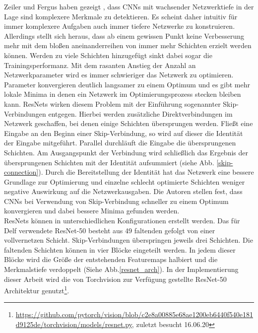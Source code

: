 Zeiler und Fergus haben gezeigt \cite{extraction_point_meaning}, dass CNNs mit wachsender Netzwerktiefe in der Lage sind komplexere Merkmale zu detektieren. Es scheint daher intuitiv für immer komplexere Aufgaben auch immer tiefere Netzwerke zu konstruieren. Allerdings stellt sich heraus, dass ab einem gewissen Punkt keine Verbesserung mehr mit dem bloßen aneinanderreihen von immer mehr Schichten erzielt werden können. Werden zu viele Schichten hinzugefügt sinkt dabei sogar die Trainingsperformanz. Mit dem rasanten Anstieg der Anzahl an Netzwerkparameter wird es immer schwieriger das Netzwerk zu optimieren. Parameter konvergieren deutlich langsamer zu einem Optimum und es gibt mehr lokale Minima in denen ein Netzwerk im Optimierungsprozess stecken bleiben kann. ResNets wirken diesem Problem mit der Einführung sogenannter Skip-Verbindungen entgegen. Hierbei werden zusätzliche Direktverbindungen im Netzwerk geschaffen, bei denen einige Schichten übersprungen werden. Fließt eine Eingabe an den Beginn einer Skip-Verbindung, so wird auf dieser die Identität der Eingabe mitgeführt. Parallel durchläuft die Eingabe die übersprungenen Schichten. Am Ausgangspunkt der Verbindung wird schließlich das Ergebnis der übersprungenen Schichten mit der Identität aufsummiert (siehe Abb. \ref{skip-connection}). Durch die Bereitstellung der Identität hat das Netzwerk eine bessere Grundlage zur Optimierung und einzelne schlecht optimierte Schichten weniger negative Auswirkung auf die Netzwerkausgaben. Die Autoren stellen fest, dass CNNs bei Verwendung von Skip-Verbindung schneller zu einem Optimum konvergieren und dabei bessere Minima gefunden werden. 
\\
ResNets können in unterschiedlichen Konfigurationen erstellt werden. Das für Delf verwendete ResNet-50 besteht aus 49 faltenden gefolgt von einer vollvernetzen Schicht. Skip-Verbindungen überspringen jeweils drei Schichten. Die faltenden Schichten können in vier Blöcke eingeteilt werden. In jedem dieser Blöcke wird die Größe der entstehenden Featuremaps halbiert und die Merkmalstiefe verdoppelt (Siehe Abb.\ref{resnet_arch}). In der Implementierung dieser Arbeit wird die von Torchvision zur Verfügung gestellte ResNet-50 Architektur genutzt\footnote[2]{\url{https://github.com/pytorch/vision/blob/c2e8a00885e68ae1200eb6440f540e181d9125de/torchvision/models/resnet.py}, zuletzt besucht 16.06.20}. 